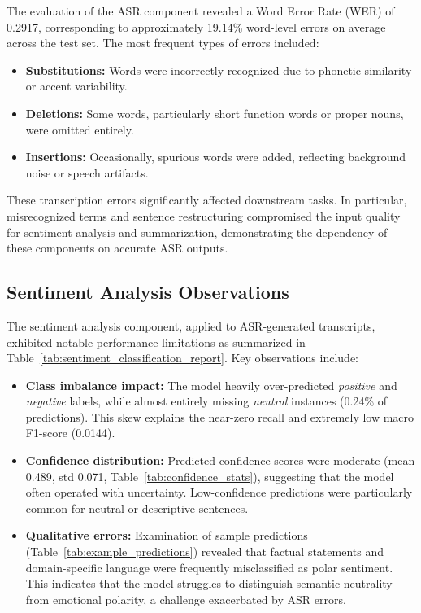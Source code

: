 The evaluation of the ASR component revealed a Word Error Rate (WER) of 0.2917, corresponding to approximately 19.14\% word-level errors on average across the test set. The most frequent types of errors included:

\begin{itemize}
    \item \textbf{Substitutions:} Words were incorrectly recognized due to phonetic similarity or accent variability.
    \item \textbf{Deletions:} Some words, particularly short function words or proper nouns, were omitted entirely.
    \item \textbf{Insertions:} Occasionally, spurious words were added, reflecting background noise or speech artifacts.
\end{itemize}

These transcription errors significantly affected downstream tasks. In particular, misrecognized terms and sentence restructuring compromised the input quality for sentiment analysis and summarization, demonstrating the dependency of these components on accurate ASR outputs.

\subsection{Sentiment Analysis Observations}

The sentiment analysis component, applied to ASR-generated transcripts, exhibited notable performance limitations as summarized in Table~\ref{tab:sentiment_classification_report}. Key observations include:

\begin{itemize}
    \item \textbf{Class imbalance impact:} The model heavily over-predicted \textit{positive} and \textit{negative} labels, while almost entirely missing \textit{neutral} instances (0.24\% of predictions). This skew explains the near-zero recall and extremely low macro F1-score (0.0144).
    \item \textbf{Confidence distribution:} Predicted confidence scores were moderate (mean 0.489, std 0.071, Table~\ref{tab:confidence_stats}), suggesting that the model often operated with uncertainty. Low-confidence predictions were particularly common for neutral or descriptive sentences.
    \item \textbf{Qualitative errors:} Examination of sample predictions (Table~\ref{tab:example_predictions}) revealed that factual statements and domain-specific language were frequently misclassified as polar sentiment. This indicates that the model struggles to distinguish semantic neutrality from emotional polarity, a challenge exacerbated by ASR errors.
\end{itemize}

